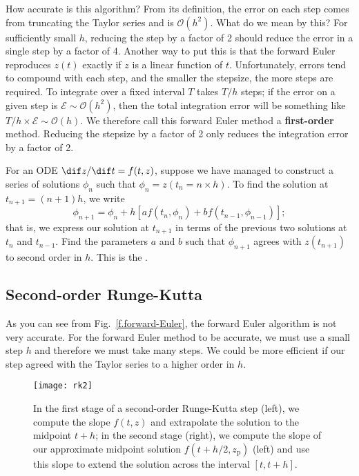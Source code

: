 How accurate is this  algorithm? From its definition, the error on each step comes from truncating the Taylor series and is $\mathcal{O}(h^{2})$. What do we mean by this? For sufficiently small $h$, reducing the step by a factor of 2 should reduce the error in a single step by a factor of 4. Another way to put this is that the forward Euler reproduces $z(t)$ exactly if $z$ is a linear function of $t$.
Unfortunately, errors tend to compound with each step, and the smaller the stepsize, the more steps are required. To integrate over a fixed interval $T$ takes $T/h$ steps; if the error on a given step is $\mathcal{E}\sim \mathcal{O}(h^{2})$, then the total integration error will be something like $T/h \times \mathcal{E} \sim \mathcal{O}(h)$.  We therefore call this forward Euler method a \textbf{first-order} method. Reducing the stepsize by a factor of 2 only reduces the integration error by a factor of 2.

\begin{exercisebox}
For an ODE $\dif z/\dif t = f(t,z)$, suppose we have managed to construct a series of solutions $\phi_{n}$ such that $\phi_{n} = z(t_{n}=n\times h)$. To find the solution at $t_{n+1}=(n+1)h$, we write
\[
\phi_{n+1} = \phi_{n} + h\left[af(t_{n},\phi_{n}) + bf(t_{n-1},\phi_{n-1})\right];
\]
that is, we express our solution at $t_{n+1}$ in terms of the previous two solutions at $t_{n}$ and $t_{n-1}$. Find the parameters $a$ and $b$ such that $\phi_{n+1}$ agrees with $z(t_{n+1})$ to second order in $h$. This is the .
\end{exercisebox}

\subsection{Second-order Runge-Kutta}

As you can see from Fig.~\ref{f.forward-Euler}, the forward Euler algorithm is not very accurate.
For the forward Euler method to be accurate, we must use a small step $h$ and therefore we must take many steps. We could be more efficient if our step agreed with the Taylor series to a higher order in $h$.

\begin{figure}
\texttt{[image: rk2]}
\caption[The second-order Runge-Kutta method]{\label{f.rk2}
In the first stage of a second-order Runge-Kutta step (left), we compute the slope $f(t,z)$ and extrapolate the solution to the midpoint $t+h$; in the second stage (right), we compute the slope of our approximate midpoint solution $f(t+h/2,z_{\mathrm{p}})$ (left) and use this slope to extend the solution across the interval $[t,t+h]$.}
\end{figure}

